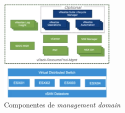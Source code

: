 \begin{figure}[h!]
  \centering
  \includegraphics[width=0.5\textwidth]{imaxes/conceptosPrevios/componentsMANAGEDomain.png}
  \caption{Componentes de \textit{management domain}}
  \label{fig:componentsMNGDomain}
\end{figure}
\FloatBarrier 


